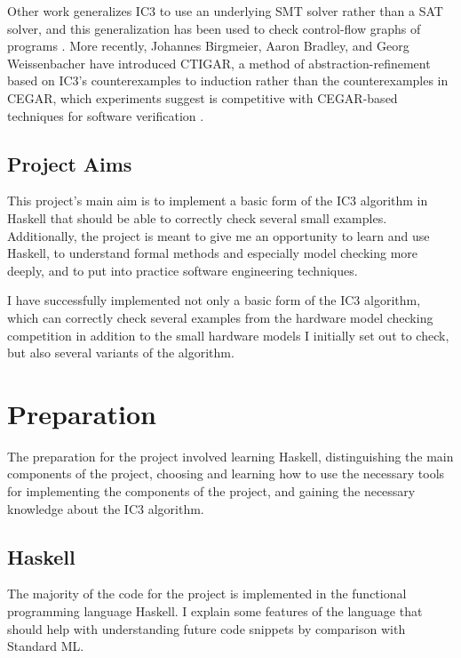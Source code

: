 \documentclass[12pt,a4paper,twoside,openright]{report}
\begin{document}
Other work generalizes IC3 to use an underlying SMT solver rather than a
SAT solver, and this generalization has been used to check control-flow
graphs of programs \cite{cimatti12}.
More recently, Johannes Birgmeier, Aaron Bradley, and Georg Weissenbacher
have introduced CTIGAR, a method of abstraction-refinement based on IC3's
counterexamples to induction rather than the counterexamples in CEGAR,
which experiments suggest is competitive with CEGAR-based techniques for
software verification \cite{birgmeier14}.

\section{Project Aims}

This project's main aim is to implement a basic form of the IC3 algorithm in
Haskell that should be able to correctly check several
small examples. Additionally, the project is meant to give me an opportunity
to learn and use Haskell, to understand formal methods and especially model
checking more deeply, and to put into practice software engineering techniques.

I have successfully implemented not only a basic form of the IC3 algorithm,
which can correctly check several examples from the hardware model checking
competition in addition to the small hardware models I initially set out
to check, but also several variants of the algorithm.

\chapter{Preparation}

The preparation for the project involved learning Haskell, distinguishing
the main components of the project, choosing and learning how to use
the necessary tools for implementing the components of the project,
and gaining the necessary knowledge about the IC3 algorithm.

\section{Haskell}

The majority of the code for the project is implemented in the functional
programming language Haskell. I explain some features of the
language that should help with understanding future code snippets
by comparison with Standard ML.

\end{document}
